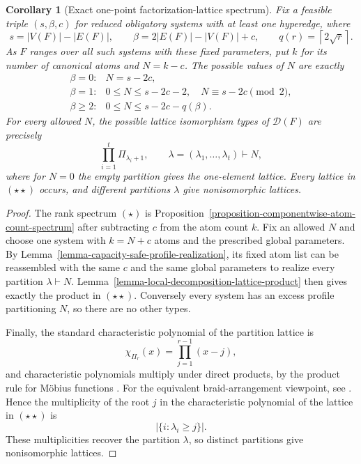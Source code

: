 \documentclass[a4paper,11pt,reqno]{amsart}
\theoremstyle{plain}
\newtheorem{corollary}[theorem]{Corollary}
\theoremstyle{definition}
\theoremstyle{remark}
\begin{document}
\begin{corollary}[Exact one-point factorization-lattice spectrum]
\label{corollary-factorization-lattice-spectrum}
Fix a feasible triple $(s,\beta,c)$ for reduced obligatory systems with at
least one hyperedge, where
\[
 s=|V(F)|-|E(F)|,
 \qquad
 \beta=2|E(F)|-|V(F)|+c,
 \qquad
 q(r)=\left\lceil2\sqrt r\right\rceil.
\]
As $F$ ranges over all such systems with these fixed parameters, put $k$ for
its number of canonical atoms and $N=k-c$.  The possible values of $N$ are
exactly
\[
\begin{array}{ll}
\beta=0:&N=s-2c,\\[1mm]
\beta=1:&0\le N\le s-2c-2,\quad N\equiv s-2c\pmod2,\\[1mm]
\beta\ge2:&0\le N\le s-2c-q(\beta).
\end{array}
\tag{\(\star\)}
\]
For every allowed $N$, the possible lattice isomorphism types of
$\mathcal D(F)$ are precisely
\[
 \prod_{i=1}^t\Pi_{\lambda_i+1},
 \qquad
 \lambda=(\lambda_1,\ldots,\lambda_t)\vdash N,
 \tag{\(\star\star\)}
\]
where for $N=0$ the empty partition gives the one-element lattice.  Every
lattice in \((\star\star)\) occurs, and different partitions $\lambda$ give
nonisomorphic lattices.
\end{corollary}
\begin{proof}
The rank spectrum \((\star)\) is
Proposition~\ref{proposition-componentwise-atom-count-spectrum} after
subtracting $c$ from the atom count $k$.  Fix an allowed $N$ and choose one
system with $k=N+c$ atoms and the prescribed global parameters.  By
Lemma~\ref{lemma-capacity-safe-profile-realization}, its fixed atom list can be
reassembled with the same $c$ and the same global parameters to realize every
partition $\lambda\vdash N$.  Lemma~\ref{lemma-local-decomposition-lattice-product}
then gives exactly the product in \((\star\star)\).  Conversely every system
has an excess profile partitioning $N$, so there are no other types.

Finally, the standard characteristic polynomial of the partition lattice
\citep[Chapter~3]{stanley2012} is
\[
 \chi_{\Pi_{r}}(x)=\prod_{j=1}^{r-1}(x-j),
\]
and characteristic polynomials multiply under direct products, by the
product rule for M\"obius functions \citep{rota1964,stanley2012}.
For the equivalent braid-arrangement viewpoint, see
\citet[Lectures~1--2]{stanley2007}.  Hence the
multiplicity of the root $j$ in the characteristic polynomial of the lattice
in \((\star\star)\) is
\[
 |\{i:\lambda_i\ge j\}|.
\]
These multiplicities recover the partition $\lambda$, so distinct partitions
give nonisomorphic lattices.
\end{proof}
\end{document}

